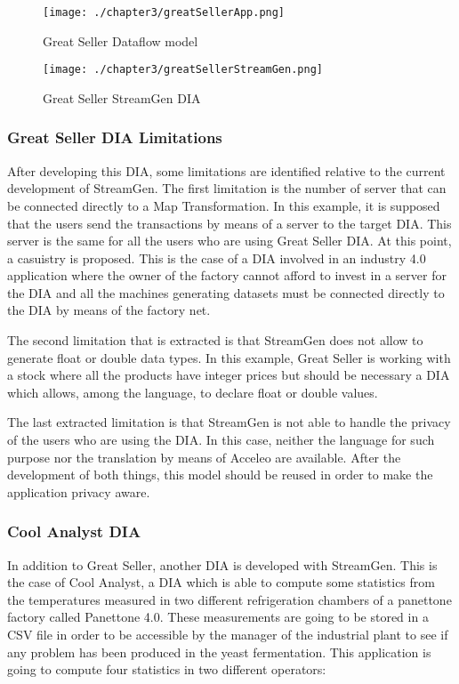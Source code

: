\begin{figure}
\centering
{\texttt{[image: ./chapter3/greatSellerApp.png]}}
\caption{Great Seller Dataflow model}
\label{fig:Great Seller Dataflow model}
\end{figure}

\begin{figure}
\centering
{\texttt{[image: ./chapter3/greatSellerStreamGen.png]}}
\caption{Great Seller StreamGen DIA}
\label{fig:Great Seller StreamGen DIA}
\end{figure}

\subsubsection*{Great Seller DIA Limitations}

After developing this DIA, some limitations are identified relative to the current development of StreamGen. The first limitation is the number of server that can be connected directly to a Map Transformation. In this example, it is supposed that the users send the transactions by means of a server to the target DIA. This server is the same for all the users who are using Great Seller DIA. At this point, a casuistry is proposed. This is the case of a DIA involved in an industry 4.0 application where the owner of the factory cannot afford to invest in a server for the DIA and all the machines generating datasets must be connected directly to the DIA by means of the factory net.

The second limitation that is extracted is that StreamGen does not allow to generate float or double data types. In this example, Great Seller is working with a stock where all the products have integer prices but should be necessary a DIA which allows, among the language, to declare float or double values.

The last extracted limitation is that StreamGen is not able to handle the privacy of the users who are using the DIA. In this case, neither the language for such purpose nor the translation by means of Acceleo are available. After the development of both things, this model should be reused in order to make the application privacy aware.

\subsubsection{Cool Analyst DIA}

In addition to Great Seller, another DIA is developed with StreamGen. This is the case of Cool Analyst, a DIA which is able to compute some statistics from the temperatures measured in two different refrigeration chambers of a panettone factory called Panettone 4.0. These measurements are going to be stored in a CSV file in order to be accessible by the manager of the industrial plant to see if any problem has been produced in the yeast fermentation. This application is going to compute four statistics in two different operators:

